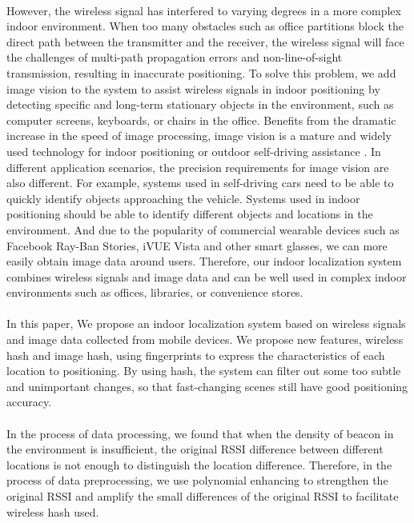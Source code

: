 \documentclass[a4paper,12pt]{report}
\begin{document}
\paragraph{}
However, the wireless signal has interfered to varying degrees in a more complex indoor environment. When too many obstacles such as office partitions block the direct path between the transmitter and the receiver, the wireless signal will face the challenges of multi-path propagation errors and non-line-of-sight transmission, resulting in inaccurate positioning. To solve this problem, we add image vision to the system to assist wireless signals in indoor positioning by detecting specific and long-term stationary objects in the environment, such as computer screens, keyboards, or chairs in the office. Benefits from the dramatic increase in the speed of image processing, image vision is a mature and widely used technology for indoor positioning \cite{Li2021VideoLoc, Li2018SweepLoc, Fusco2018Indoor} or outdoor self-driving assistance \cite{Mobileye, OmniEyes}. In different application scenarios, the precision requirements for image vision are also different. For example, systems used in self-driving cars need to be able to quickly identify objects approaching the vehicle. Systems used in indoor positioning should be able to identify different objects and locations in the environment. And due to the popularity of commercial wearable devices such as Facebook Ray-Ban Stories, iVUE Vista and other smart glasses, we can more easily obtain image data around users. Therefore, our indoor localization system combines wireless signals and image data and can be well used in complex indoor environments such as offices, libraries, or convenience stores.
%

\paragraph{}
In this paper, We propose an indoor localization system based on wireless signals and image data collected from mobile devices. We propose new features, wireless hash and image hash, using fingerprints to express the characteristics of each location to positioning. By using hash, the system can filter out some too subtle and unimportant changes, so that fast-changing scenes still have good positioning accuracy.
%

\paragraph{}
In the process of data processing, we found that when the density of beacon in the environment is insufficient, the original RSSI difference between different locations is not enough to distinguish the location difference. Therefore, in the process of data preprocessing, we use polynomial enhancing to strengthen the original RSSI and amplify the small differences of the original RSSI to facilitate wireless hash used.
%
\end{document}
